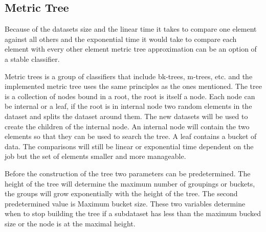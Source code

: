 \subsection{Metric Tree}
Because of the datasets size and the linear time it takes to compare one element against all others and the exponential time it would take to compare each element with every other element metric tree approximation can be an option of a stable classifier. 

Metric trees is a group of classifiers that include bk-trees, m-trees, etc. and the implemented metric tree uses the same principles as the ones mentioned. The tree is a collection of nodes bound in a root, the root is itself a node. Each node can be internal or a leaf, if the root is in internal node two random elements in the dataset and splits the dataset around them. The new datasets will be used to create the children of the internal node. An internal node will contain the two elements so that they can be used to search the tree. A leaf contains a bucket of data. The comparisons will still be linear or exponential time dependent on the job but the set of elements smaller and more manageable.

Before the construction of the tree two parameters can be predetermined. The height of the tree will determine the maximum number of  groupings or buckets, the groups will grow exponentially with the height of the tree. The second predetermined value is Maximum bucket size. These two variables determine when to stop building the tree if a subdataset has less than the maximum bucked size or the node is at the maximal height.
